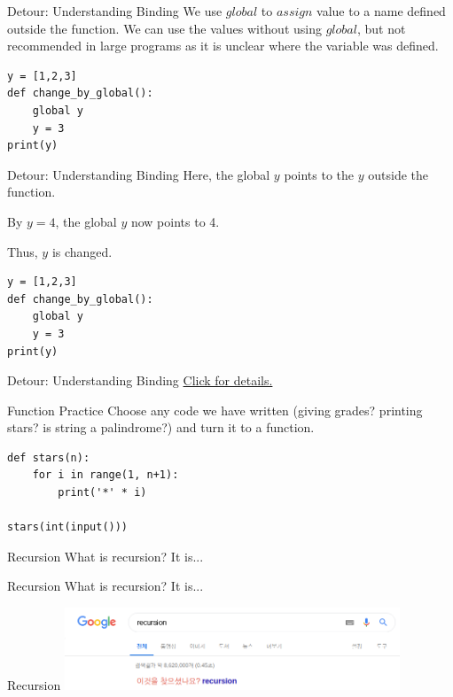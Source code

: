 \documentclass{beamer}
\begin{document}
\begin{frame}[fragile]{Detour: Understanding Binding}
  We use $global$ to $assign$ value to a name defined outside the function.
  We can use the values without using $global$, but not recommended in large
  programs as it is unclear where the variable was defined.
  \begin{lstlisting}
y = [1,2,3]
def change_by_global():
    global y
    y = 3
print(y)
  \end{lstlisting}
\end{frame}

\begin{frame}[fragile]{Detour: Understanding Binding}
  Here, the global $y$ points to the $y$ outside the function.

  By $y = 4$, the global $y$ now points to 4.

  Thus, $y$ is changed.
  \begin{lstlisting}
y = [1,2,3]
def change_by_global():
    global y
    y = 3
print(y)
  \end{lstlisting}
\end{frame}

\begin{frame}{Detour: Understanding Binding}
  \href{https://stackoverflow.com/questions/575196/why-can-a-function-modify-some-arguments-as-perceived-by-the-caller-but-not-oth}{Click
  for details.}
\end{frame}

\begin{frame}[fragile]{Function Practice}
  Choose any code we have written (giving grades? printing stars? is
  string a palindrome?) and turn it to a function.

  \begin{lstlisting}
def stars(n):
    for i in range(1, n+1):
        print('*' * i)

stars(int(input()))
  \end{lstlisting}
\end{frame}

\begin{frame}{Recursion}
  What is recursion?  It is...
\end{frame}

\begin{frame}{Recursion}
  What is recursion?  It is...
\end{frame}

\begin{frame}{Recursion}
  \includegraphics[width=100mm]{./recursion.png}
\end{frame}
\end{document}
